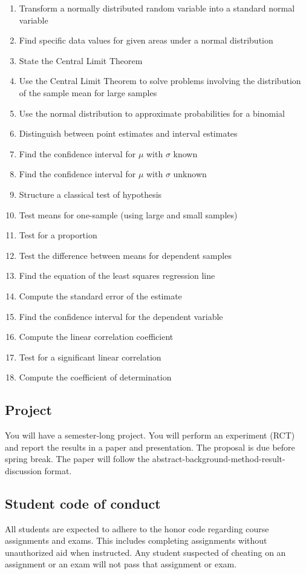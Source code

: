 \documentclass[12pt,letterpaper]{article}
\begin{document}
\begin{enumerate}
\item Transform a normally distributed random variable into a standard normal variable
\item Find specific data values for given areas under a normal distribution
\item State the Central Limit Theorem
\item Use the Central Limit Theorem to solve problems involving the distribution of the sample mean for large samples
\item Use the normal distribution to approximate probabilities for a binomial
\item Distinguish between point estimates and interval estimates
\item Find the confidence interval for $\mu$ with $\sigma$ known
\item Find the confidence interval for $\mu$ with $\sigma$ unknown
\item Structure a classical test of hypothesis
\item Test means for one-sample (using large and small samples)
\item Test for a proportion
\item Test the difference between means for dependent samples
\item Find the equation of the least squares regression line
\item Compute the standard error of the estimate
\item Find the confidence interval for the dependent variable
\item Compute the linear correlation coefficient
\item Test for a significant linear correlation
\item Compute the coefficient of determination
\end{enumerate}

\subsection*{Project}
You will have a semester-long project. You will perform an experiment (RCT) and report the results in a paper and presentation. The proposal is due before spring break. The paper will follow the abstract-background-method-result-discussion format.

\subsection*{Student code of conduct}
All students are expected to adhere to the honor code regarding course assignments and exams.  This includes completing assignments without unauthorized aid when instructed.  Any student suspected of cheating on an assignment or an exam will not pass that assignment or exam.
\end{document}
